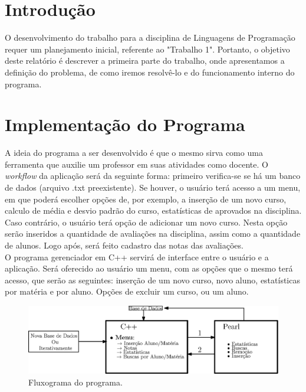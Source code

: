 \documentclass[12pt,a4paper]{article}
\begin{document}
%
%

\cleardoublepage
\section{Introdução}

O desenvolvimento do trabalho para a disciplina de Linguagens de Programação requer um planejamento inicial, referente ao "Trabalho 1". Portanto, o objetivo deste relatório é descrever a primeira parte do trabalho, onde apresentamos a definição do problema, de como iremos resolvê-lo e do funcionamento interno do programa.


\section{Implementação do Programa}

A ideia do programa a ser desenvolvido é que o mesmo sirva como uma ferramenta que auxilie um professor em suas atividades como docente. O \textit{workflow} da aplicação será da seguinte forma: primeiro verifica-se se há um banco de dados (arquivo .txt preexistente). Se houver, o usuário terá acesso a um menu, em que poderá escolher opções de, por exemplo, a inserção de um novo curso, calculo de média e desvio padrão do curso, estatísticas de aprovados na disciplina. Caso contrário, o usuário terá opção de adicionar um novo curso. Nesta opção serão inseridos a quantidade de avaliações na disciplina, assim como a quantidade de alunos. Logo após, será feito cadastro das notas das avaliações. ~\\

O programa gerenciador em C++ servirá de interface entre o usuário e a aplicação. Será oferecido ao usuário um menu, com as opções que o mesmo terá acesso, que serão as seguintes: inserção de um novo curso, novo aluno, estatísticas por matéria e por aluno. Opções de excluir um curso, ou um aluno. 

\begin{figure}[!h]
\centering
\includegraphics[width=1\linewidth]{figs/programa}
\caption{Fluxograma do programa.}
\label{fluxo}
\end{figure}
\end{document}
